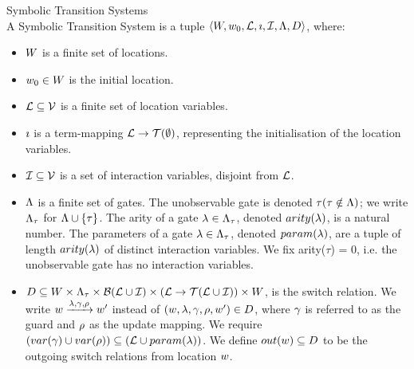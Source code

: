\begin{definition} Symbolic Transition Systems \\
A Symbolic Transition System is a tuple $\langle W,w_0,\mathcal{L},\imath,\mathcal{I},\Lambda,D\rangle$, where:
\begin{itemize}
\item $W$ is a finite set of locations.
\item $w_0 \in W$ is the initial location.
\item $\mathcal{L} \subseteq \mathcal{V}$ is a finite set of location variables.
\item $\imath$ is a term-mapping $\mathcal{L} \rightarrow \mathcal{T}(\emptyset)$, representing the initialisation of the location variables.
\item $\mathcal{I} \subseteq \mathcal{V}$ is a set of interaction variables, disjoint from $\mathcal{L}$.
\item $\Lambda$ is a finite set of gates. The unobservable gate is denoted $\tau (\tau \notin \Lambda)$; we write $\Lambda_\tau$ for $\Lambda \cup \{\tau\}$. The arity of a gate $\lambda\in\Lambda_\tau$, denoted $arity(\lambda)$, is a natural number. The parameters of a gate $\lambda\in\Lambda_\tau$, denoted $param(\lambda)$, are a tuple of length $arity(\lambda)$ of distinct interaction variables. We fix arity($\tau$) = 0, i.e. the unobservable gate has no interaction variables.
\item $D \subseteq W \times \Lambda_\tau \times \mathcal{B}(\mathcal{L} \cup \mathcal{I}) \times (\mathcal{L} \rightarrow \mathcal{T}(\mathcal{L} \cup \mathcal{I})) \times W$, is the switch relation. We write $w\xrightarrow{\lambda,\gamma,\rho}w'$ instead of $(w,\lambda,\gamma,\rho,w')\in D$, where $\gamma$ is referred to as the guard and $\rho$ as the update mapping. We require $(var(\gamma) \cup var(\rho)) \subseteq (\mathcal{L} \cup param(\lambda))$. We define $out(w) \subseteq D$ to be the outgoing switch relations from location $w$.
\end{itemize}
\end{definition}

